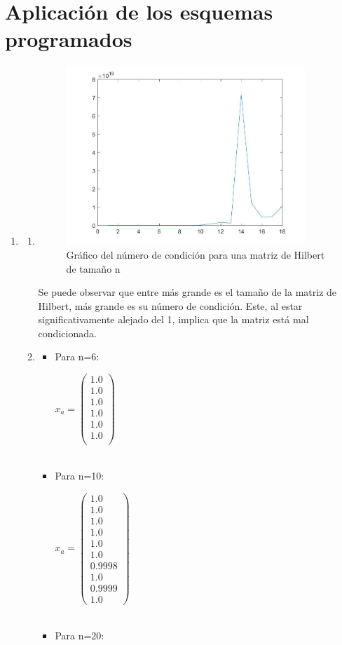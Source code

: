 \documentclass{udpreport}
\begin{document}
 \section{Aplicación de los esquemas programados}
 \begin{enumerate}
 	\item   
 		\begin{enumerate}
 			\item 	
 			\begin{figure}[H]
 				\centering
 				\includegraphics[width=9cm]{grafo1-a}
 				\caption{Gráfico del número de condición para una matriz de Hilbert de tamaño n}
 			\end{figure}
 			Se puede observar que entre más grande es el tamaño de la matriz de Hilbert, más grande es su número de condición. Este, al estar significativamente alejado del 1, implica que la matriz está mal condicionada.  %
 			\item 
 				\begin{itemize} 				
 				\item Para n=6:
 				
 				$x_{a} = \left(\begin{array}{c} 1.0\\ 1.0\\ 1.0\\ 1.0\\ 1.0\\ 1.0\\ \end{array}\right)$
 				\\
 				\\
 				\item Para n=10:
 				
 				$x_{a} = \left(\begin{array}{c} 1.0\\ 1.0\\ 1.0\\ 1.0\\ 1.0\\ 1.0\\ 0.9998\\ 1.0\\ 0.9999\\ 1.0 \end{array}\right)$
 				\\
 				\\
 				\item Para n=20:
 				

\end{itemize}
\end{enumerate}
\end{enumerate}
\end{document}
